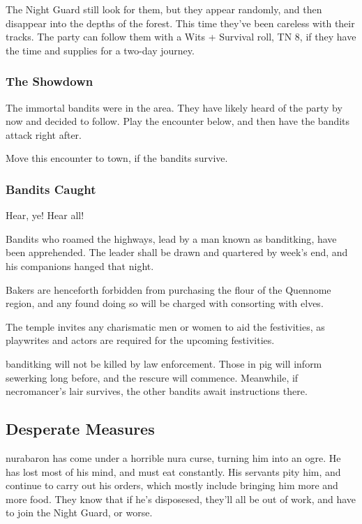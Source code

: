 The Night Guard still look for them, but they appear randomly, and then disappear into the depths of the forest.  This time they've been careless with their tracks.  The party can follow them with a Wits + Survival roll, TN 8, if they have the time and supplies for a two-day journey.

\subsubsection{The Showdown}
The immortal bandits were in the area.  They have likely heard of the party by now and decided to follow.  Play the encounter below, and then have the bandits attack right after.

\humansoldier

Move this encounter to town, if the bandits survive.

\subsubsection{Bandits Caught}


\begin{boxtext}
	Hear, ye!  Hear all!

	Bandits who roamed the highways, lead by a man known as \gls{banditking}, have been apprehended.  The leader shall be drawn and quartered by week's end, and his companions hanged that night.

	Bakers are henceforth forbidden from purchasing the flour of the Quennome region, and any found doing so will be charged with consorting with elves.

	The temple invites any charismatic men or women to aid the festivities, as playwrites and actors are required for the upcoming festivities.

\end{boxtext}

\Gls{banditking} will not be killed by law enforcement.  Those in \gls{pig} will inform \gls{sewerking} long before, and the rescure will commence.  Meanwhile, if \gls{necromancer}'s lair survives, the other bandits await instructions there.

\subsection[Desperate Measures]{Desperate Measures}\label{desperatemeasures}

\gls{nurabaron} has come under a horrible nura curse, turning him into an ogre.  He has lost most of his mind, and must eat constantly.  His servants pity him, and continue to carry out his orders, which mostly include bringing him more and more food.  They know that if he's disposesed, they'll all be out of work, and have to join the Night Guard, or worse.

